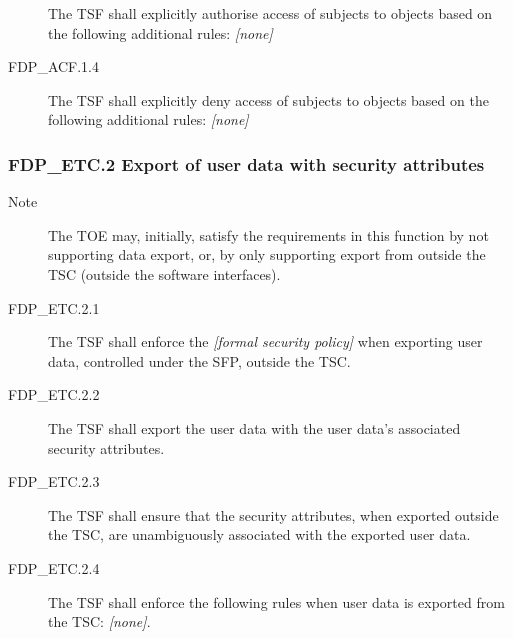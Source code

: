 \documentclass[10pt,a4paper,english]{article}
\begin{document}
\begin{description}
The TSF shall explicitly authorise access of subjects to
objects based on the following additional rules: \emph{{[}none]}

\item[FDP{\_}ACF.1.4]

The TSF shall explicitly deny access of subjects to objects
based on the following additional rules: \emph{{[}none]}

\end{description}



\hypertarget{fdp-etc-2-export-of-user-data-with-security-attributes}{}
\subsubsection*{FDP{\_}ETC.2 Export of user data with security attributes}
\begin{description}
\item[Note]

The TOE may, initially, satisfy the requirements in this
function by not supporting data export, or, by only
supporting export from outside the TSC (outside the
software interfaces).

\item[FDP{\_}ETC.2.1]

The TSF shall enforce the \emph{{[}formal security policy]} when exporting user
data, controlled under the SFP, outside the TSC.

\item[FDP{\_}ETC.2.2]

The TSF shall export the user data with the user data's associated 
security attributes.

\item[FDP{\_}ETC.2.3]

The TSF shall ensure that the security attributes, when 
exported outside the TSC, are unambiguously associated 
with the exported user data.

\item[FDP{\_}ETC.2.4]

The TSF shall enforce the following rules when user data 
is exported from the TSC: \emph{{[}none]}.

\end{description}
\end{document}
